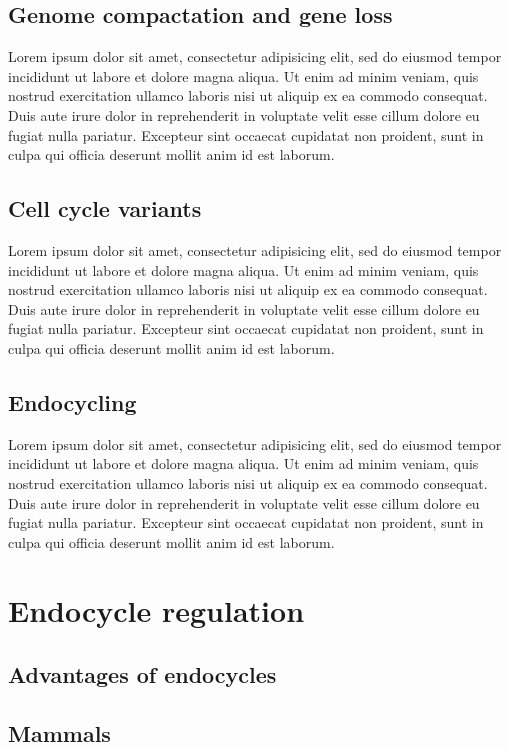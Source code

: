 \documentclass[11pt,twoside,a4paper]{report}
\begin{document}
		\subsection{Genome compactation and gene loss}
		Lorem ipsum dolor sit amet, consectetur adipisicing elit, sed do eiusmod tempor incididunt ut labore et dolore magna aliqua. Ut enim ad minim veniam, quis nostrud exercitation ullamco laboris nisi ut aliquip ex ea commodo consequat. Duis aute irure dolor in reprehenderit in voluptate velit esse cillum dolore eu fugiat nulla pariatur. Excepteur sint occaecat cupidatat non proident, sunt in culpa qui officia deserunt mollit anim id est laborum.

		\subsection{Cell cycle variants}
		Lorem ipsum dolor sit amet, consectetur adipisicing elit, sed do eiusmod tempor incididunt ut labore et dolore magna aliqua. Ut enim ad minim veniam, quis nostrud exercitation ullamco laboris nisi ut aliquip ex ea commodo consequat. Duis aute irure dolor in reprehenderit in voluptate velit esse cillum dolore eu fugiat nulla pariatur. Excepteur sint occaecat cupidatat non proident, sunt in culpa qui officia deserunt mollit anim id est laborum.

		\subsection{Endocycling}
		Lorem ipsum dolor sit amet, consectetur adipisicing elit, sed do eiusmod tempor incididunt ut labore et dolore magna aliqua. Ut enim ad minim veniam, quis nostrud exercitation ullamco laboris nisi ut aliquip ex ea commodo consequat. Duis aute irure dolor in reprehenderit in voluptate velit esse cillum dolore eu fugiat nulla pariatur. Excepteur sint occaecat cupidatat non proident, sunt in culpa qui officia deserunt mollit anim id est laborum.

	\section{Endocycle regulation}
		\subsection{Advantages of endocycles}
		\subsection{Mammals}
\end{document}
